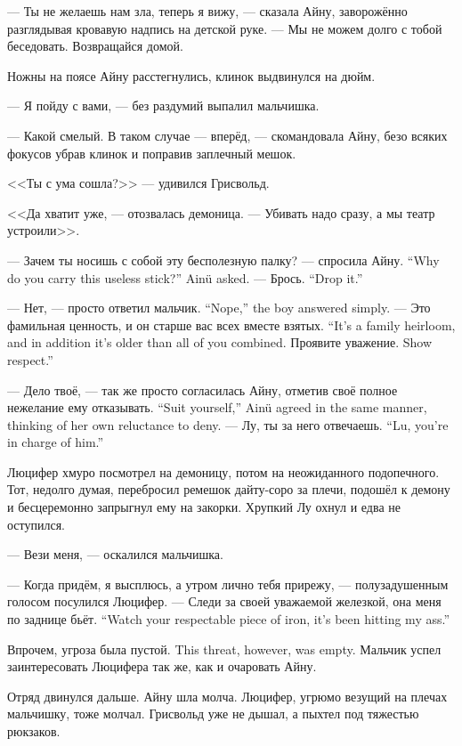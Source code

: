 --- Ты не желаешь нам зла, теперь я вижу, --- сказала Айну, заворожённо разглядывая кровавую надпись на детской руке.
--- Мы не можем долго с тобой беседовать.
Возвращайся домой.

Ножны на поясе Айну расстегнулись, клинок выдвинулся на дюйм.

--- Я пойду с вами, --- без раздумий выпалил мальчишка.

--- Какой смелый.
В таком случае --- вперёд, --- скомандовала Айну, безо всяких фокусов убрав клинок и поправив заплечный мешок.

<<Ты с ума сошла?>> --- удивился Грисвольд.

<<Да хватит уже, --- отозвалась демоница.
--- Убивать надо сразу, а мы театр устроили>>.

{--- Зачем ты носишь с собой эту бесполезную палку? --- спросила Айну.}
{``Why do you carry this useless stick?'' Ain\"{u} asked.}
{--- Брось.}
{``Drop it.''}

{--- Нет, --- просто ответил мальчик.}
{``Nope,'' the boy answered simply.}
{--- Это фамильная ценность, и он старше вас всех вместе взятых.}
{``It's a family heirloom, and in addition it's older than all of you combined.}
{Проявите уважение.}
{Show respect.''}

{--- Дело твоё, --- так же просто согласилась Айну, отметив своё полное нежелание ему отказывать.}
{``Suit yourself,'' Ain\"{u} agreed in the same manner, thinking of her own reluctance to deny.}
{--- Лу, ты за него отвечаешь.}
{``Lu, you're in charge of him.''}

Люцифер хмуро посмотрел на демоницу, потом на неожиданного подопечного.
Тот, недолго думая, перебросил ремешок дайту-соро за плечи, подошёл к демону и бесцеремонно запрыгнул ему на закорки.
Хрупкий Лу охнул и едва не оступился.

--- Вези меня, --- оскалился мальчишка.

--- Когда придём, я высплюсь, а утром лично тебя прирежу, --- полузадушенным голосом посулился Люцифер.
{--- Следи за своей уважаемой железкой, она меня по заднице бьёт.}
{``Watch your respectable piece of iron, it's been hitting my ass.''}

{Впрочем, угроза была пустой.}
{This threat, however, was empty.}
Мальчик успел заинтересовать Люцифера так же, как и очаровать Айну.

Отряд двинулся дальше.
Айну шла молча.
Люцифер, угрюмо везущий на плечах мальчишку, тоже молчал.
Грисвольд уже не дышал, а пыхтел под тяжестью рюкзаков.

